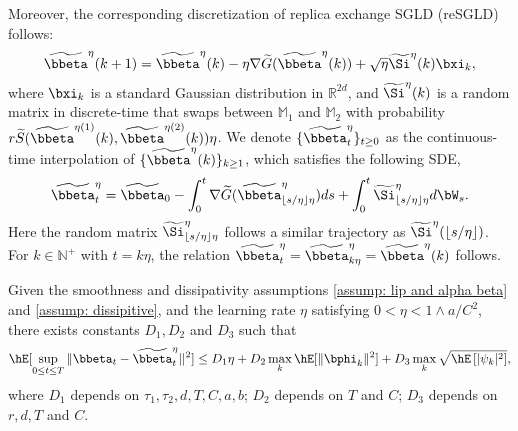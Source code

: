Moreover, the corresponding discretization of replica exchange SGLD (reSGLD) follows:
\begin{equation}
\begin{split}
\label{resgld_2}
    \widetilde \bbeta^{\eta}(k+1)=\widetilde \bbeta^{\eta}(k)-
    \eta\nabla \widetilde G(\widetilde \bbeta^{\eta}(k)) + \sqrt{\eta}\widetilde \Si^{\eta}(k)\bxi_k,
\end{split}
\end{equation}
where $\bxi_k$ is a standard Gaussian distribution in $\mathbb{R}^{2d}$, and $\widetilde \Si^{\eta}(k)$ is a random matrix in discrete-time that swaps between $\mathbb{M}_1$ and $\mathbb{M}_2$ with probability $r\widetilde S(\widetilde \bbeta^{\eta(1)}(k), \widetilde \bbeta^{\eta(2)}(k))\eta$. We denote $\{\widetilde \bbeta_t^{\eta}\}_{t\ge 0 }$ as the continuous-time interpolation of $\{\widetilde \bbeta^{\eta}(k)\}_{k\ge 1}$, which satisfies the following SDE, 
\begin{equation}\label{SGD continuous time interpolation}
	\widetilde \bbeta_t^{\eta}=\widetilde \bbeta_0-\int_0^t\nabla \widetilde G(\widetilde \bbeta^{\eta}_{\lfloor s/\eta \rfloor \eta})ds+\int_0^t\widetilde\Si^{\eta}_{\lfloor s/\eta \rfloor\eta}d\bW_s.
\end{equation}
Here the random matrix $\widetilde \Si_{\lfloor s/\eta\rfloor \eta}^{\eta}$ follows a similar trajectory as $\widetilde \Si^{\eta}(\lfloor s/\eta \rfloor)$. For $k\in \mathbb N^{+}$ with $t=k\eta$, the relation $\widetilde \bbeta_t^{\eta}=\widetilde \bbeta_{k\eta}^{\eta}=\widetilde \bbeta^{\eta}(k)$ follows.


\begin{lemma}\label{discretization}
Given the smoothness and dissipativity assumptions \eqref{assump: lip and alpha beta} and \eqref{assump: dissipitive}, and the learning rate $\eta$ satisfying $0<\eta<1 \land a/C^2$, there exists constants $D_1, D_2$ and $D_3$ such that
\begin{equation}
	\begin{split}
&	\hE[\sup_{0\le t\le T}\|\bbeta_t-\widetilde \bbeta^{\eta}_t||^2] \le D_1 \eta + D_2 \max_{k}\hE[\|\bphi_k\|^2]+D_3\max_{k}\sqrt{\hE\left[|\psi_{k}|^2\right]},\\
	\end{split}
\end{equation}
where $ D_1$ depends on $\tau_1,\tau_2,d, T, C,a,b$; $D_2$ depends on $T$ and $C$; $D_3$ depends on $r, d, T$ and $C$.
\end{lemma}{}

